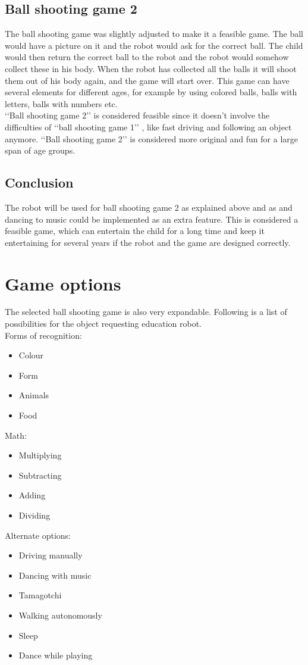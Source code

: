 \documentclass[11pt,twoside,a4paper]{report}
\begin{document}
\subsection{Ball shooting game 2}
The ball shooting game was slightly adjusted to make it a feasible game. The ball would have a picture on it and the robot would ask for the correct ball. The child would then return the correct ball to the robot and the robot would somehow collect these in his body. When the robot has collected all the balls it will shoot them out of his body again, and the game will start over. This game can have several elements for different ages, for example by using colored balls, balls with letters, balls with numbers etc. \\
\lq\lq{}Ball shooting game 2\rq\rq{} is considered feasible since it doesn\rq{}t involve the difficulties of \lq\lq{}ball shooting game 1\rq\rq{} , like fast driving and following an object anymore. \lq\lq{}Ball shooting game 2\rq\rq{} is considered more original and fun for a large span of age groups.
\subsection{Conclusion}
The robot will be used for ball shooting game 2 as explained above and as  and dancing to music could be implemented as an extra feature. This is considered a feasible game, which can entertain the child for a long time and keep it entertaining for several years if the robot and the game are designed correctly.


\section{Game options}
The selected ball shooting game is also very expandable. Following is a list of possibilities for the object requesting education robot. \\

Forms of recognition:
\begin{itemize}
\item Colour
\item Form
\item Animals
\item Food
\end{itemize}
Math:
\begin{itemize}
\item Multiplying
\item Subtracting
\item Adding
\item Dividing
\end{itemize}
Alternate options:
\begin{itemize}
\item Driving manually
\item Dancing with music
\item Tamagotchi 
\item Walking autonomously
\item Sleep
\item Dance while playing

\end{itemize}
\end{document}
